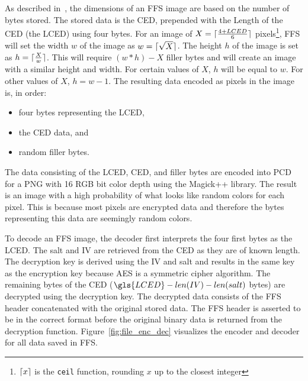As described in~, the dimensions of an \gls{FFS} image are based on the number of bytes stored. The stored data is the CED, prepended with the Length of the \gls{CED} (\ie the \gls{LCED}) using four bytes. For an image of $X = \lceil \frac{4 + LCED}{6} \rceil$ pixels\footnote{$\lceil x \rceil$ is the \texttt{ceil} function, rounding $x$ up to the closest integer}, \gls{FFS} will set the width $w$ of the image as $w = \lceil \sqrt{X} \rceil$. The height $h$ of the image is set as $h = \lceil \frac{X}{w} \rceil$. This will require $(w * h) - X$ filler bytes and will create an image with a similar height and width. For certain values of $X$, $h$ will be equal to $w$. For other values of $X$, $h = w-1$. The resulting data encoded as pixels in the image is, in order:
\begin{itemize}
	\item four bytes representing the \gls{LCED},
	\item the \gls{CED} data, and
	\item random filler bytes.
\end{itemize}

The data consisting of the \gls{LCED}, CED, and filler bytes are encoded into \gls{PCD} for a PNG with 16 \gls{RGB} bit color depth using the Magick++ library. The result is an image with a high probability of what looks like random colors for each pixel. This is because most pixels are encrypted data and therefore the bytes representing this data are seemingly random colors.

To decode an \gls{FFS} image, the decoder first interprets the four first bytes as the \gls{LCED}. The salt and \gls{IV} are retrieved from the \gls{CED} as they are of known length. The decryption key is derived using the \gls{IV} and salt and results in the same key as the encryption key because \gls{AES} is a symmetric cipher algorithm. The remaining bytes of the \gls{CED} ($\gls{LCED} - len(IV) - len(salt)$ bytes) are decrypted using the decryption key. The decrypted data consists of the \gls{FFS} header concatenated with the original stored data. The \gls{FFS} header is asserted to be in the correct format before the original binary data is returned from the decryption function. Figure~\ref{fig:file_enc_dec} visualizes the encoder and decoder for all data saved in \gls{FFS}.

